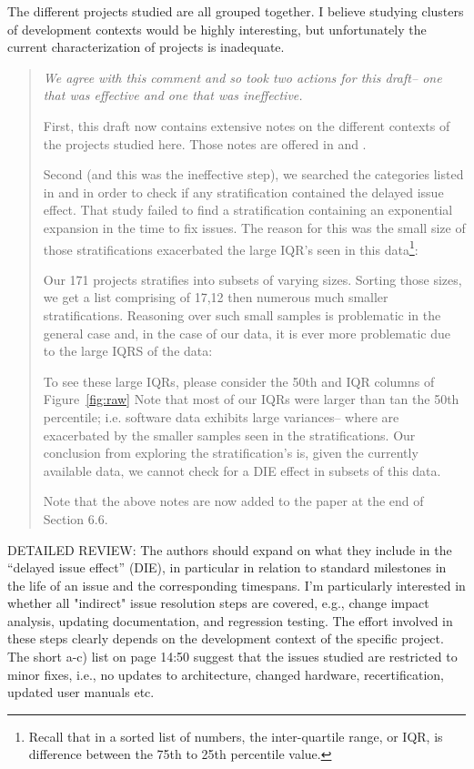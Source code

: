 The different projects studied are all grouped together. I
believe studying clusters of development contexts would be
highly interesting, but unfortunately the current
characterization of projects is inadequate.  

\begin{quote}{\em  We agree with this comment and so took two actions for this draft-- one that was effective and one that was ineffective. 

First, this draft now contains extensive notes on the different contexts of the
projects studied here. Those notes are offered in  and .

Second (and this was the ineffective step), we  searched the categories   listed in  and 
in order to check if any stratification contained the delayed issue effect. 
That study   failed to find a stratification
containing an exponential expansion in the time to fix issues. The reason for this was  the small size
of those stratifications  exacerbated the large IQR's seen in this data\footnote{Recall that in a sorted list of numbers,
the inter-quartile range, or IQR, is difference between the 
  75th to 25th percentile value.}:
\bi
\item
Our 171 projects   stratifies into subsets of varying sizes. Sorting those sizes, we get a list
comprising of 17,12 then numerous much smaller stratifications.  Reasoning over such small samples
is problematic in the general case and, in the case of our data, it is ever more problematic due to
the large IQRS of the data:
\item
To see these large IQRs,  please consider the 50th and IQR columns of Figure~\ref{fig:raw} Note that most of our IQRs were larger than tan the 50th percentile; i.e. software
data exhibits large variances-- where are exacerbated by the smaller samples seen in the stratifications.
\ei
Our conclusion from exploring the stratification's is, given the currently available data, we cannot check
for a DIE effect in subsets of this data.

Note that the above notes are now added to the paper at the end of Section 6.6.
 }\end{quote}



DETAILED REVIEW: The authors should expand on what they
include in the ``delayed issue effect'' (DIE), in particular
in relation to standard milestones in the life of an issue
and the corresponding timespans.  I'm particularly
interested in whether all "indirect" issue resolution steps
are covered, e.g., change impact analysis, updating
documentation, and regression testing. The effort involved
in these steps clearly depends on the development context of
the specific project. The short a-c) list on page 14:50
suggest that the issues studied are restricted to minor
fixes, i.e., no updates to architecture, changed hardware,
recertification, updated user manuals etc.

